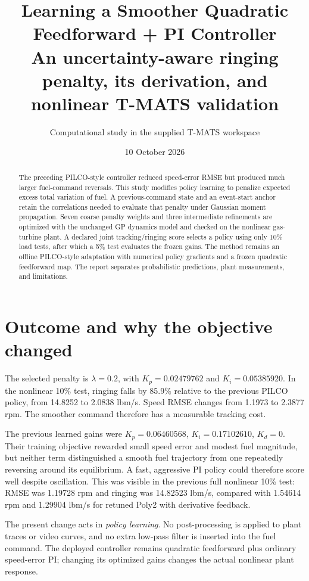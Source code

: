 \documentclass[11pt,a4paper]{article}
\title{Learning a Smoother Quadratic Feedforward + PI Controller\\\large An uncertainty-aware ringing penalty, its derivation, and nonlinear T-MATS validation}
\author{Computational study in the supplied T-MATS workspace}\date{10 October 2026}
\begin{document}
\maketitle
\begin{abstract}
The preceding PILCO-style controller reduced speed-error RMSE but produced much larger fuel-command reversals. This study modifies policy learning to penalize expected excess total variation of fuel. A previous-command state and an event-start anchor retain the correlations needed to evaluate that penalty under Gaussian moment propagation. Seven coarse penalty weights and three intermediate refinements are optimized with the unchanged GP dynamics model and checked on the nonlinear gas-turbine plant. A declared joint tracking/ringing score selects a policy using only 10\% load tests, after which a 5\% test evaluates the frozen gains. The method remains an offline PILCO-style adaptation with numerical policy gradients and a frozen quadratic feedforward map. The report separates probabilistic predictions, plant measurements, and limitations.
\end{abstract}
\section{Outcome and why the objective changed}
The selected penalty is $\lambda=0.2$, with $K_p=0.02479762$ and $K_i=0.05385920$. In the nonlinear 10\% test, ringing falls by 85.9\% relative to the previous PILCO policy, from 14.8252 to 2.0838 lbm/s. Speed RMSE changes from 1.1973 to 2.3877 rpm. The smoother command therefore has a measurable tracking cost.

The previous learned gains were $K_p=0.06460568$, $K_i=0.17102610$, $K_d=0$. Their training objective rewarded small speed error and modest fuel magnitude, but neither term distinguished a smooth fuel trajectory from one repeatedly reversing around its equilibrium. A fast, aggressive PI policy could therefore score well despite oscillation. This was visible in the previous full nonlinear 10\% test: RMSE was 1.19728 rpm and ringing was 14.82523 lbm/s, compared with 1.54614 rpm and 1.29904 lbm/s for retuned Poly2 with derivative feedback.

The present change acts in \emph{policy learning}. No post-processing is applied to plant traces or video curves, and no extra low-pass filter is inserted into the fuel command. The deployed controller remains quadratic feedforward plus ordinary speed-error PI; changing its optimized gains changes the actual nonlinear plant response.
\end{document}
